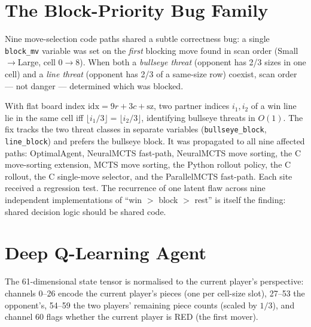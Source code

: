 \documentclass[10pt,twocolumn]{article}
\begin{document}
\section{The Block-Priority Bug Family}

Nine move-selection code paths shared a subtle correctness bug: a single
\texttt{block\_mv} variable was set on the \emph{first} blocking move found
in scan order (Small$\to$Large, cell 0$\to$8). When both a \emph{bullseye
threat} (opponent has 2/3 sizes in one cell) and a \emph{line threat}
(opponent has 2/3 of a same-size row) coexist, scan order --- not danger ---
determined which was blocked.

With flat board index $\mathrm{idx} = 9r + 3c + \mathrm{sz}$, two partner
indices $i_1,i_2$ of a win line lie in the same cell iff
$\lfloor i_1/3\rfloor = \lfloor i_2/3\rfloor$, identifying bullseye threats
in $O(1)$. The fix tracks the two threat classes in separate variables
(\texttt{bullseye\_block}, \texttt{line\_block}) and prefers the bullseye
block. It was propagated to all nine affected paths: OptimalAgent,
NeuralMCTS fast-path, NeuralMCTS move sorting, the C move-sorting extension,
MCTS move sorting, the Python rollout policy, the C rollout, the C
single-move selector, and the ParallelMCTS fast-path. Each site received a
regression test. The recurrence of one latent flaw across nine independent
implementations of ``win $>$ block $>$ rest'' is itself the finding: shared
decision logic should be shared code.

\section{Deep Q-Learning Agent}

The 61-dimensional state tensor is normalised to the current player's
perspective: channels 0--26 encode the current player's pieces (one per
cell-size slot), 27--53 the opponent's, 54--59 the two players' remaining
piece counts (scaled by $1/3$), and channel 60 flags whether the current
player is RED (the first mover).
\end{document}
